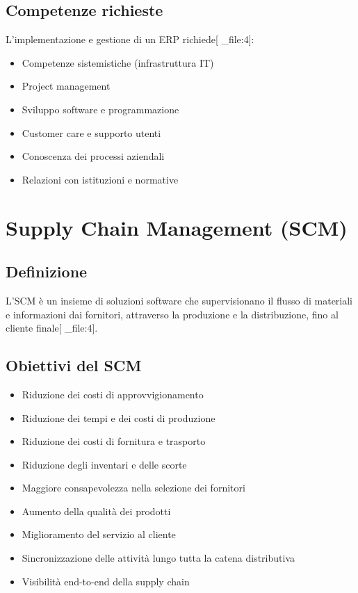 \documentclass[12pt,a4paper]{article}
\begin{document}
\subsection{Competenze richieste}
L'implementazione e gestione di un ERP richiede[ _file:4]:
\begin{itemize}
    \item Competenze sistemistiche (infrastruttura IT)
    \item Project management
    \item Sviluppo software e programmazione
    \item Customer care e supporto utenti
    \item Conoscenza dei processi aziendali
    \item Relazioni con istituzioni e normative
\end{itemize}

\section{Supply Chain Management (SCM)}

\subsection{Definizione}
L'SCM è un insieme di soluzioni software che supervisionano il flusso di materiali e informazioni dai fornitori, attraverso la produzione e la distribuzione, fino al cliente finale[ _file:4].

\subsection{Obiettivi del SCM}
\begin{itemize}
    \item Riduzione dei costi di approvvigionamento
    \item Riduzione dei tempi e dei costi di produzione
    \item Riduzione dei costi di fornitura e trasporto
    \item Riduzione degli inventari e delle scorte
    \item Maggiore consapevolezza nella selezione dei fornitori
    \item Aumento della qualità dei prodotti
    \item Miglioramento del servizio al cliente
    \item Sincronizzazione delle attività lungo tutta la catena distributiva
    \item Visibilità end-to-end della supply chain
\end{itemize}
\end{document}
